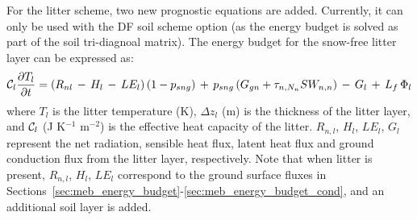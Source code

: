 For the litter scheme, two new prognostic equations are added.
Currently, it can only be used with the DF soil scheme option
(as the energy budget is solved as part of the soil tri-diagnoal
matrix).
The energy budget for the snow-free litter layer can be expressed as:
%
\begin{equation}\label{eqT}
 {\cal{C}}_{l}\frac{\partial T_{l}}{\partial t} =
 \left(
R_{nl}\,-\,H_l\,-\,LE_l\right)\left( 1-p_{sng}\right)
\,+\, p_{sng} \left(G_{gn} + \tau_{n,N_n}SW_{n,n}\right)
\,-\,G_{l}\,+\,L_f\,\Phi_{l} 
\end{equation}
%
where $T_l$ is the litter temperature (K),
$\Delta z_l$ (m) is the thickness of the litter layer, 
and ${\cal{C}}_l$ (J K$^{-1}$ m$^{-2}$) is the effective
heat capacity of the litter. 
$R_{n,l}$, $H_l$, $LE_l$, $G_{l}$ represent the net radiation, sensible
heat flux, latent heat flux and ground conduction flux from the litter
layer, respectively. 
%
Note that when litter is present, $R_{n,l}$, $H_l$, $LE_l$
correspond to the ground surface fluxes in 
Sections~\ref{sec:meb_energy_budget}-\ref{sec:meb_energy_budget_cond},
and an additional soil layer is added.

